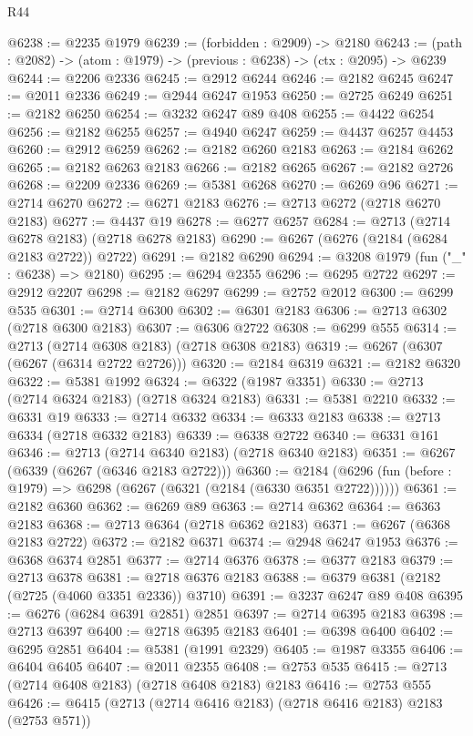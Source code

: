 \begin{lexlean}{R44}
\begin{coremodule}
@6238 := @2235 @1979
@6239 := (forbidden : @2909) -> @2180
@6243 := (path : @2082) -> (atom : @1979) -> (previous : @6238) -> (ctx : @2095) -> @6239
@6244 := @2206 @2336
@6245 := @2912 @6244
@6246 := @2182 @6245
@6247 := @2011 @2336
@6249 := @2944 @6247 @1953
@6250 := @2725 @6249
@6251 := @2182 @6250
@6254 := @3232 @6247 @89 @408
@6255 := @4422 @6254
@6256 := @2182 @6255
@6257 := @4940 @6247
@6259 := @4437 @6257 @4453
@6260 := @2912 @6259
@6262 := @2182 @6260 @2183
@6263 := @2184 @6262
@6265 := @2182 @6263 @2183
@6266 := @2182 @6265
@6267 := @2182 @2726
@6268 := @2209 @2336
@6269 := @5381 @6268
@6270 := @6269 @96
@6271 := @2714 @6270
@6272 := @6271 @2183
@6276 := @2713 @6272 (@2718 @6270 @2183)
@6277 := @4437 @19
@6278 := @6277 @6257
@6284 := @2713 (@2714 @6278 @2183) (@2718 @6278 @2183)
@6290 := @6267 (@6276 (@2184 (@6284 @2183 @2722)) @2722)
@6291 := @2182 @6290
@6294 := @3208 @1979 (fun ("_" : @6238) => @2180)
@6295 := @6294 @2355
@6296 := @6295 @2722
@6297 := @2912 @2207
@6298 := @2182 @6297
@6299 := @2752 @2012
@6300 := @6299 @535
@6301 := @2714 @6300
@6302 := @6301 @2183
@6306 := @2713 @6302 (@2718 @6300 @2183)
@6307 := @6306 @2722
@6308 := @6299 @555
@6314 := @2713 (@2714 @6308 @2183) (@2718 @6308 @2183)
@6319 := @6267 (@6307 (@6267 (@6314 @2722 @2726)))
@6320 := @2184 @6319
@6321 := @2182 @6320
@6322 := @5381 @1992
@6324 := @6322 (@1987 @3351)
@6330 := @2713 (@2714 @6324 @2183) (@2718 @6324 @2183)
@6331 := @5381 @2210
@6332 := @6331 @19
@6333 := @2714 @6332
@6334 := @6333 @2183
@6338 := @2713 @6334 (@2718 @6332 @2183)
@6339 := @6338 @2722
@6340 := @6331 @161
@6346 := @2713 (@2714 @6340 @2183) (@2718 @6340 @2183)
@6351 := @6267 (@6339 (@6267 (@6346 @2183 @2722)))
@6360 := @2184 (@6296 (fun (before : @1979) => @6298 (@6267 (@6321 (@2184 (@6330 @6351 @2722))))))
@6361 := @2182 @6360
@6362 := @6269 @89
@6363 := @2714 @6362
@6364 := @6363 @2183
@6368 := @2713 @6364 (@2718 @6362 @2183)
@6371 := @6267 (@6368 @2183 @2722)
@6372 := @2182 @6371
@6374 := @2948 @6247 @1953
@6376 := @6368 @6374 @2851
@6377 := @2714 @6376
@6378 := @6377 @2183
@6379 := @2713 @6378
@6381 := @2718 @6376 @2183
@6388 := @6379 @6381 (@2182 (@2725 (@4060 @3351 @2336)) @3710)
@6391 := @3237 @6247 @89 @408
@6395 := @6276 (@6284 @6391 @2851) @2851
@6397 := @2714 @6395 @2183
@6398 := @2713 @6397
@6400 := @2718 @6395 @2183
@6401 := @6398 @6400
@6402 := @6295 @2851
@6404 := @5381 (@1991 @2329)
@6405 := @1987 @3355
@6406 := @6404 @6405
@6407 := @2011 @2355
@6408 := @2753 @535
@6415 := @2713 (@2714 @6408 @2183) (@2718 @6408 @2183) @2183
@6416 := @2753 @555
@6426 := @6415 (@2713 (@2714 @6416 @2183) (@2718 @6416 @2183) @2183 (@2753 @571))

\end{coremodule}
\end{lexlean}
